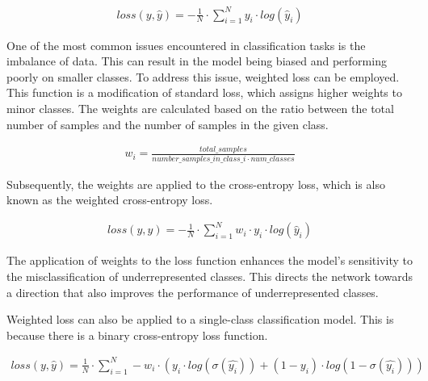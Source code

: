 \documentclass[
a4paper, 
12pt,
grayscalebody, %
abstract=on,
twoside, BCOR10mm, 12pt, DIV13,headinclude, footexclude, final, abstracton, openright
]{ibireprt}
\numberwithin{equation}{chapter}
\numberwithin{table}{chapter}
\numberwithin{figure}{chapter}
\numberwithin{algorithm}{chapter}
\numberwithin{example}{chapter}
\numberwithin{example}{chapter}
\begin{document}
\begin{align}
	loss(y,\hat{y}) = - \frac{1}{N} \cdot \sum_{i=1}^{N}y_i \cdot log(\hat{y}_i)
\end{align}


One of the most common issues encountered in classification tasks is the imbalance of data. This can result in the model being biased and performing poorly on smaller classes. To address this issue, weighted loss can be employed. This function is a modification of standard loss, which assigns higher weights to minor classes. The weights are calculated based on the ratio between the total number of samples and the number of samples in the given class. 

\begin{align}
	w_i = \frac{total\_samples}{number\_samples\_in\_class\_i \cdot num\_classes}
\end{align}

Subsequently, the weights are applied to the cross-entropy loss, which is also known as the weighted cross-entropy loss. 

\begin{align}
	loss(y,\hat{y})= -	\frac{1}{N}\cdot \sum_{i=1}^{N} w_i \cdot y_i \cdot log(\hat{y}_i)
\end{align}

The application of weights to the loss function enhances the model's sensitivity to the misclassification of underrepresented classes. This directs the network towards a direction that also improves the performance of underrepresented classes.

Weighted loss can also be applied to a single-class classification model. This is because there is a binary cross-entropy loss function.

\begin{align}
	loss(y,\hat{y})=\frac{1}{N}\cdot\sum_{i=1}^{N} -w_i \cdot (y_i \cdot log(\sigma(\hat{y_i}))+(1-y_i)\cdot log(1-\sigma(\hat{y_i})) )
\end{align}

\end{document}
